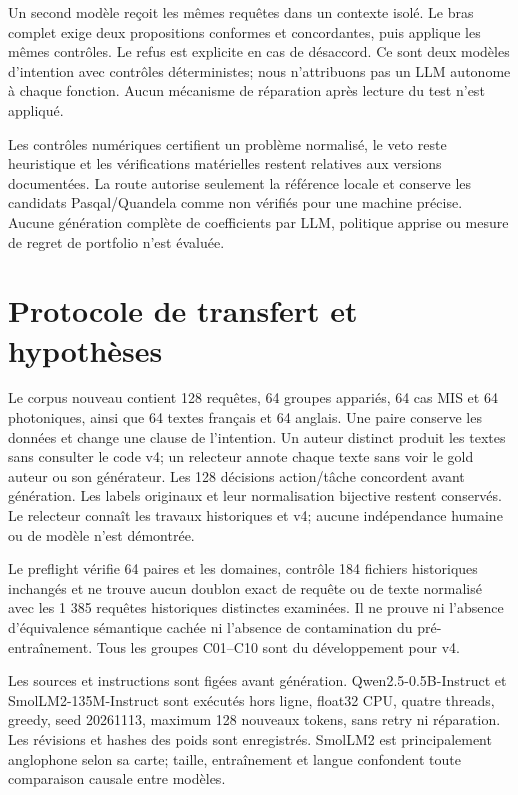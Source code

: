 \documentclass[11pt]{article}
\begin{document}
Un second modèle reçoit les mêmes requêtes dans un contexte isolé. Le bras complet exige deux propositions conformes et concordantes, puis applique les mêmes contrôles. Le refus est explicite en cas de désaccord. Ce sont deux modèles d'intention avec contrôles déterministes; nous n'attribuons pas un LLM autonome à chaque fonction. Aucun mécanisme de réparation après lecture du test n'est appliqué.

Les contrôles numériques certifient un problème normalisé, le veto reste heuristique et les vérifications matérielles restent relatives aux versions documentées. La route autorise seulement la référence locale et conserve les candidats Pasqal/Quandela comme non vérifiés pour une machine précise. Aucune génération complète de coefficients par LLM, politique apprise ou mesure de regret de portfolio n'est évaluée.

\section{Protocole de transfert et hypothèses}

Le corpus nouveau contient 128 requêtes, 64 groupes appariés, 64 cas MIS et 64 photoniques, ainsi que 64 textes français et 64 anglais. Une paire conserve les données et change une clause de l'intention. Un auteur distinct produit les textes sans consulter le code v4; un relecteur annote chaque texte sans voir le gold auteur ou son générateur. Les 128 décisions action/tâche concordent avant génération. Les labels originaux et leur normalisation bijective restent conservés. Le relecteur connaît les travaux historiques et v4; aucune indépendance humaine ou de modèle n'est démontrée.

Le preflight vérifie 64 paires et les domaines, contrôle 184 fichiers historiques inchangés et ne trouve aucun doublon exact de requête ou de texte normalisé avec les 1 385 requêtes historiques distinctes examinées. Il ne prouve ni l'absence d'équivalence sémantique cachée ni l'absence de contamination du pré-entraînement. Tous les groupes C01–C10 sont du développement pour v4.

Les sources et instructions sont figées avant génération. Qwen2.5-0.5B-Instruct et SmolLM2-135M-Instruct sont exécutés hors ligne, float32 CPU, quatre threads, greedy, seed 20261113, maximum 128 nouveaux tokens, sans retry ni réparation. Les révisions et hashes des poids sont enregistrés. SmolLM2 est principalement anglophone selon sa carte; taille, entraînement et langue confondent toute comparaison causale entre modèles.
\end{document}

